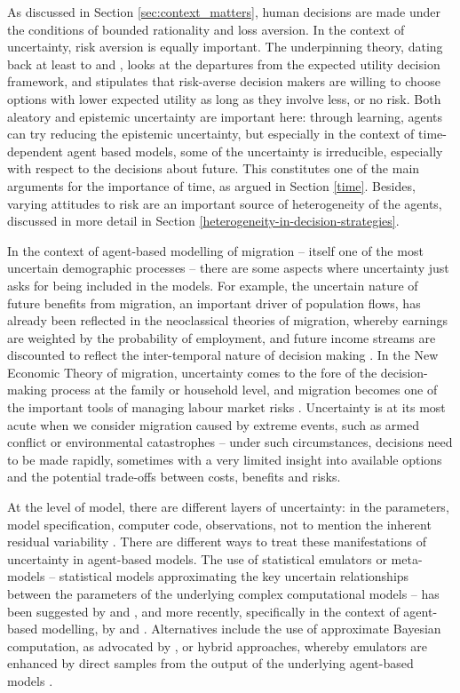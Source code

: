 \documentclass{article}
\begin{document}
As discussed in Section \ref{sec:context_matters}, human decisions are made under the conditions of bounded rationality and loss aversion. In the context of uncertainty, risk aversion is equally important. The underpinning theory, dating back at least to \citet{Pratt1964} and \citet{Arrow1965}, looks at the departures from the expected utility decision framework, and stipulates that risk-averse decision makers are willing to choose options with lower expected utility as long as they involve less, or no risk. Both aleatory and epistemic uncertainty are important here: through learning, agents can try reducing the epistemic uncertainty, but especially in the context of time-dependent agent based models, some of the uncertainty is irreducible, especially with respect to the decisions about future. This constitutes one of the main arguments for the importance of time, as argued in Section \ref{time}. Besides, varying attitudes to risk are an important source of heterogeneity of the agents, discussed in more detail in Section \ref{heterogeneity-in-decision-strategies}.

In the context of agent-based modelling of migration -- itself one of the most uncertain demographic processes -- there are some aspects where uncertainty just asks for being included in the models. For example, the uncertain nature of future benefits from migration, an important driver of population flows, has already been reflected in the neoclassical theories of migration, whereby earnings are weighted by the probability of employment, and future income streams are discounted to reflect the inter-temporal nature of decision making \citep{Massey1993}. In the New Economic Theory of migration, uncertainty comes to the fore of the decision-making process at the family or household level, and migration becomes one of the important tools of managing labour market risks \citep{Stark1985}. Uncertainty is at its most acute when we consider migration caused by extreme events, such as armed conflict or environmental catastrophes -- under such circumstances, decisions need to be made rapidly, sometimes with a very limited insight into available options and the potential trade-offs between costs, benefits and risks. 

At the level of model, there are different layers of uncertainty: in the parameters, model specification, computer code, observations, not to mention the inherent residual variability \citep{Kennedy2001}. There are different ways to treat these manifestations of uncertainty in agent-based models. The use of statistical emulators or meta-models \citep{Kleijnen2000} -- statistical models approximating the key uncertain relationships between the parameters of the underlying complex computational models -- has been suggested by \citet{Kennedy2001} and \citet{Oakley2004}, and more recently, specifically in the context of agent-based modelling, by \citet{Heard2015} and \citet{Hilton2016}. Alternatives include the use of approximate Bayesian computation, as advocated by \citet{Grazzini2017}, or hybrid approaches, whereby emulators are enhanced by direct samples from the output of the underlying agent-based models \citep{Kaminski2015}. 
\end{document}
